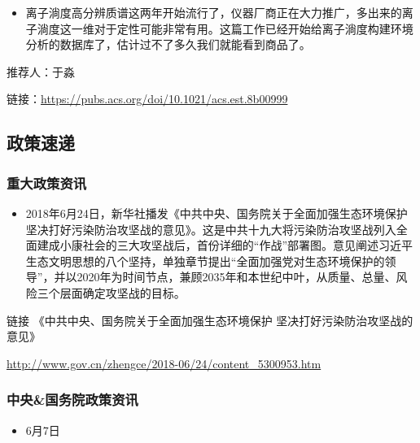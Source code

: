 \documentclass[
]{book}
\providecommand{\tightlist}{%
  \setlength{\itemsep}{0pt}\setlength{\parskip}{0pt}}
\begin{document}
\begin{itemize}
\tightlist
\item
  离子淌度高分辨质谱这两年开始流行了，仪器厂商正在大力推广，多出来的离子淌度这一维对于定性可能非常有用。这篇工作已经开始给离子淌度构建环境分析的数据库了，估计过不了多久我们就能看到商品了。
\end{itemize}

推荐人：于淼

链接：\url{https://pubs.acs.org/doi/10.1021/acs.est.8b00999}

\hypertarget{ux653fux7b56ux901fux9012-2}{%
\subsection*{政策速递}\label{ux653fux7b56ux901fux9012-2}}

\hypertarget{ux91cdux5927ux653fux7b56ux8d44ux8baf-2}{%
\subsubsection*{重大政策资讯}\label{ux91cdux5927ux653fux7b56ux8d44ux8baf-2}}

\begin{itemize}
\tightlist
\item
  2018年6月24日，新华社播发《中共中央、国务院关于全面加强生态环境保护 坚决打好污染防治攻坚战的意见》。这是中共十九大将污染防治攻坚战列入全面建成小康社会的三大攻坚战后，首份详细的``作战''部署图。意见阐述习近平生态文明思想的八个坚持，单独章节提出``全面加强党对生态环境保护的领导''，并以2020年为时间节点，兼顾2035年和本世纪中叶，从质量、总量、风险三个层面确定攻坚战的目标。
\end{itemize}

链接 《中共中央、国务院关于全面加强生态环境保护 坚决打好污染防治攻坚战的意见》

\url{http://www.gov.cn/zhengce/2018-06/24/content_5300953.htm}

\hypertarget{ux4e2dux592eux56fdux52a1ux9662ux653fux7b56ux8d44ux8baf-2}{%
\subsubsection*{中央\&国务院政策资讯}\label{ux4e2dux592eux56fdux52a1ux9662ux653fux7b56ux8d44ux8baf-2}}

\begin{itemize}
\tightlist
\item
  6月7日
\end{itemize}
\end{document}
